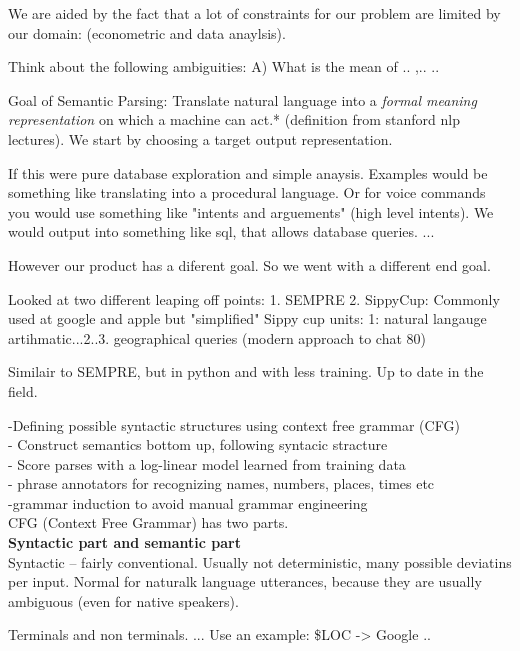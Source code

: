 \documentclass[pageno]{jpaper}
\begin{document}
We are aided by the fact that a lot of constraints for our problem are limited by our domain: (econometric and data anaylsis).


Think about the following ambiguities:
A) What is the mean of ..
,..
..


Goal of Semantic Parsing:
Translate natural language into a \textit{formal meaning representation} on which a machine can act.* (definition from stanford nlp lectures). We start by choosing a target output representation.

If this were pure database exploration and simple anaysis. Examples would be something like translating into a procedural language. Or for voice commands you would use something like "intents and arguements" (high level intents).  We would output into something like sql, that allows database queries. ...

However our product has a diferent goal. So we went with a different end goal.

Looked at two different leaping off points:
1. SEMPRE
2. SippyCup:
Commonly used at google and apple but "simplified"
Sippy cup units:
1: natural langauge artihmatic...2..3. geographical queries (modern approach to chat 80)

Similair to SEMPRE, but in python and with less training. Up to date in the field.

-Defining possible syntactic structures using context free grammar (CFG)\\
- Construct semantics bottom up, following syntacic stracture\\
- Score parses with a log-linear model learned from training data \\
- phrase annotators for recognizing names, numbers, places, times etc \\
-grammar induction to avoid manual grammar engineering \\

CFG (Context Free Grammar) has two parts.\\

\textbf{Syntactic part and semantic part} \\
Syntactic -- fairly conventional. Usually not deterministic, many possible deviatins per input. Normal for naturalk language utterances, because they are usually ambiguous (even for native speakers).

Terminals and non terminals. ... Use an example: \$LOC -> Google
 ..
 
\end{document}
